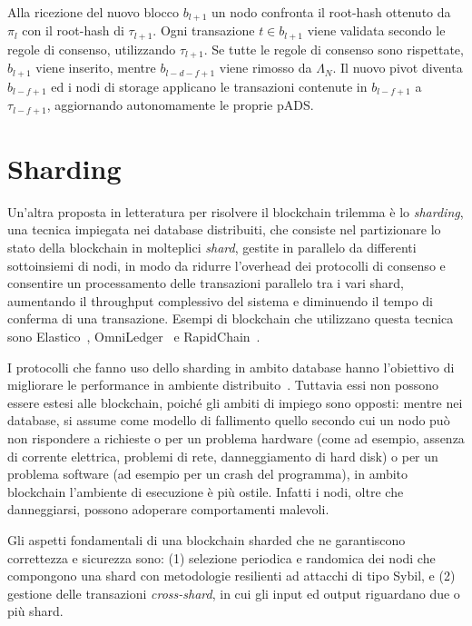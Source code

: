 Alla ricezione del nuovo blocco $b_{l+1}$ un nodo confronta il root-hash ottenuto da $\pi_l$ con il root-hash di $\tau_{l+1}$.  Ogni transazione $t \in b_{l+1}$ viene validata secondo le regole di consenso, utilizzando $\tau_{l+1}$. Se tutte le regole di consenso sono rispettate, $b_{l+1}$ viene inserito, mentre $b_{l-d-f+1}$ viene rimosso da $\Lambda_N$. Il nuovo pivot diventa $b_{l-f+1}$ ed i nodi di storage applicano le transazioni contenute in $b_{l-f+1}$ a $\tau_{l-f+1}$, aggiornando autonomamente le proprie pADS.

\section{Sharding}\label{sec:sharding}

Un'altra proposta in letteratura per risolvere il blockchain trilemma è lo \emph{sharding}, una tecnica impiegata nei database distribuiti, che consiste nel partizionare lo stato della blockchain in molteplici \emph{shard}, gestite in parallelo da differenti sottoinsiemi di nodi, in modo da ridurre l'overhead dei protocolli di consenso e consentire un processamento delle transazioni parallelo tra i vari shard, aumentando il throughput complessivo del sistema e diminuendo il tempo di conferma di una transazione.
Esempi di blockchain che utilizzano questa tecnica sono Elastico~\cite{luu2016secure}, OmniLedger~\cite{kokoris2018omniledger} e RapidChain~\cite{zamani2018rapidchain}.

I protocolli che fanno uso dello sharding in ambito database hanno l'obiettivo di migliorare le performance in ambiente distribuito~\cite{cattell2011scalable, corbett2013spanner}.
Tuttavia essi non possono essere estesi alle blockchain, poiché gli ambiti di impiego sono opposti: mentre nei database, si assume come modello di fallimento quello secondo cui un nodo può non rispondere a richieste o per un problema hardware (come ad esempio, assenza di corrente elettrica, problemi di rete, danneggiamento di hard disk) o per un problema software (ad esempio per un crash del programma), in ambito blockchain l'ambiente di esecuzione è più ostile. Infatti i nodi, oltre che danneggiarsi, possono adoperare comportamenti malevoli.

Gli aspetti fondamentali di una blockchain sharded che ne garantiscono correttezza e sicurezza sono: (1) selezione periodica e randomica dei nodi che compongono una shard con metodologie resilienti ad attacchi di tipo Sybil, e (2) gestione delle transazioni \emph{cross-shard}, in cui gli input ed output riguardano due o più shard.

